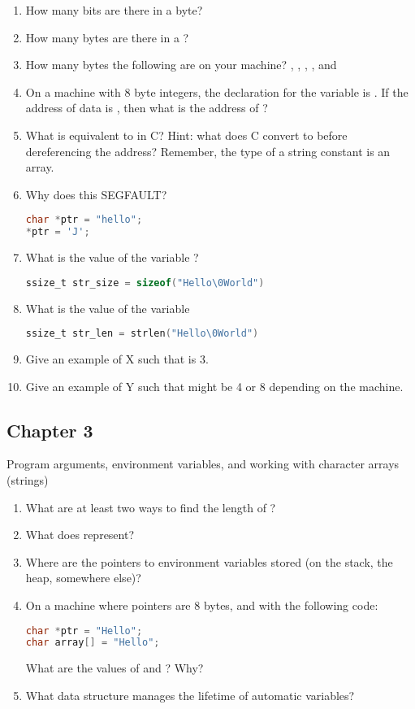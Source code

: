 \begin{enumerate}
\item How many bits are there in a byte?
\item How many bytes are there in a ?
\item How many bytes the following are on your machine? , , , , and 
\item On a machine with 8 byte integers, the declaration for the variable  is .
If the address of data is , then what is the address of ?
\item What is  equivalent to in C? Hint: what does C convert  to before dereferencing the address?
Remember, the type of a string constant  is an array.
\item Why does this SEGFAULT?
\begin{lstlisting}[language=C]
char *ptr = "hello";
*ptr = 'J';
\end{lstlisting}

\item What is the value of the variable ?
\begin{lstlisting}[language=C]
ssize_t str_size = sizeof("Hello\0World")
\end{lstlisting}
\item What is the value of the variable 
\begin{lstlisting}[language=C]
ssize_t str_len = strlen("Hello\0World")
\end{lstlisting}
\item Give an example of X such that  is 3.
\item Give an example of Y such that  might be 4 or 8 depending on the machine.
\end{enumerate}

\subsection{Chapter 3}

Program arguments, environment variables, and working with character arrays (strings)

\begin{enumerate}
\item What are at least two ways to find the length of ?
\item What does  represent?
\item Where are the pointers to environment variables stored (on the stack, the heap, somewhere else)?
\item On a machine where pointers are 8 bytes, and with the following code:
\begin{lstlisting}[language=C]
char *ptr = "Hello";
char array[] = "Hello";
\end{lstlisting}
What are the values of  and ? Why?
\item What data structure manages the lifetime of automatic variables?
\end{enumerate}

